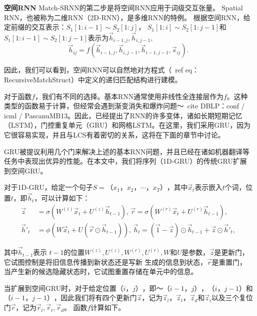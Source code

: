 \textbf{空间RNN}
Match-SRNN的第二步是将空间RNN应用于词级交互张量。 Spatial RNN，也被称为二维RNN（2D-RNN），是多维RNN的特例。 根据空间RNN，给定前缀的交互表示：$S_1[1{:}i{-}1]\!{\sim}\! S_2[1{:}j]$， $S_1[1{:}i]\!{\sim}\! S_2[1{:}j{-}1]$和$S_1[1{:}i{-}1]\!{\sim}\! S_2[1{:}j{-}1]$表示为$\vec{h}_{i-1,j},\vec{h}_{i,j-1}$, 
\begin{equation}
\vec{h}_{ij}=f(\vec{h}_{i-1,j},\vec{h}_{i,j-1},\vec{h}_{i-1,j-1},\vec{s}_{ij}).
\end{equation}

因此，我们可以看到，空间RNN可以自然地对方程式（\ ref {eq：RecursiveMatchStruct}）中定义的递归匹配结构进行建模。

对于函数$ f $，我们有不同的选择。基本RNN通常使用非线性全连接层作为$ f $。这种类型的函数易于计算，但经常会遇到渐变消失和爆炸问题〜\ cite {DBLP：conf / icml / PascanuMB13}。因此，已经提出了RNN的许多变体，诸如长期短期记忆（LSTM），门控重复单元（GRU）和网格LSTM。在这里，我们采用GRU，因为它很容易实现，并且与LCS有着密切的关系，这将在下面的章节中讨论。

GRU被提议利用几个门来解决上述的基本RNN问题，并且已经在诸如机器翻译等任务中表现出优异的性能。在本文中，我们将序列（1D-GRU）的传统GRU扩展到空间GRU。

对于1D-GRU，给定一个句子$ S {=}（x_1，x_2，\cdots，x_T）$，其中$ \vec {x} _t $表示嵌入$ t $个词，位置$ t $，即$ \vec {h} _t $，可以计算如下：
\begin{equation*}
	\begin{aligned}
		\vec{z} \,& {=} \sigma(W^{(z)}\vec{x}_t + U^{(z)}\vec{h}_{t-1}),\,\vec{r}{=} \sigma(W^{(r)}\vec{x}_t + U^{(r)}\vec{h}_{t-1}), \\
		\vec{h}'_t \,&{=} \phi(W\vec{x}_t{+}U(\vec{r}\odot \vec{h}_{t-1})),\,\vec{h}_t{=} (\vec{1}-\vec{z})\odot \vec{h}_{t-1} {+} \vec{z} \odot \vec{h}'_t,
	\end{aligned}
\end{equation*}

其中$ \vec {h} _ {t-1} $表示 $t{-}1$的位置$W^{(z)},U^{(z)},W^{(r)},U^{(r)},W$和$ U $是参数，$ \vec {z} $是更新门，它试图控制是将旧信息传播到新状态还是写新 生成的信息到状态，$ \vec {r} $是重置门，当产生新的候选隐藏状态时，它试图重置存储在单元中的信息。

当扩展到空间GRU时，对于给定位置$（i，j）$，即〜$（i { - } 1，j），（i，j { - } 1）$和$ （i { - } 1，j { - } 1）$，因此我们将有四个更新门$ \vec {z} $，记为$ \vec {z} _ {l}，\vec {z} _t ，\vec {z} _d $和$ \vec {z} _i $以及三个复位门$ \vec {r} $，记为$\vec{r}_l, \vec{r}_t, \vec{r}_d$。 函数$ f $计算如下。

